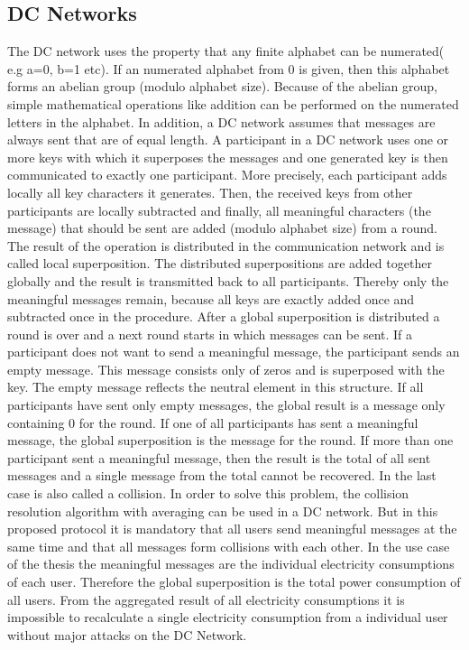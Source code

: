 \subsection{DC Networks}
The DC network uses the property that any finite alphabet can be numerated( e.g a=0, b=1 etc). If an numerated alphabet from 0 is given, then this alphabet forms an abelian group (modulo alphabet size). Because of the abelian group, simple mathematical operations like addition can be performed on the numerated letters in the alphabet.
In addition, a DC network assumes that messages are always sent that are of equal length. A participant in a DC network uses one or more keys with which it superposes the messages and one generated key is then communicated to exactly one participant. 
More precisely, each participant adds locally all key characters it generates. Then, the received keys from other participants are locally subtracted and finally, all meaningful characters (the message) that should be sent are added (modulo alphabet size) from a round. The result of the operation is distributed in the communication network and is called local superposition. 
The distributed superpositions are added together globally and the result is transmitted back to all participants. Thereby only the meaningful messages remain, because all keys are exactly added once and subtracted once in the procedure. After a global superposition is distributed a round is over and a next round starts in which messages can be sent. If a participant does not want to send a meaningful message, the participant sends an empty message. This message consists only of zeros and is superposed with the key. The empty message reflects the neutral element in this structure. If all participants have sent only empty messages, the global result is a message only containing 0 for the round. If one of all participants has sent a meaningful message, the global superposition is the message for the round. If more than one participant sent a meaningful message, then the result is the total of all sent messages and a single message from the total cannot be recovered. In the last case is also called a collision. In order to solve this problem, the collision resolution algorithm with averaging can be used in a DC network. But in this proposed protocol it is mandatory that all users send meaningful messages at the same time and that all messages form collisions with each other. In the use case of the thesis the meaningful messages are the individual electricity consumptions of each user. Therefore the global superposition is the total power consumption of all users. From the aggregated result of all electricity consumptions it is impossible to recalculate a single electricity consumption from a individual user without major attacks on the DC Network.\\
